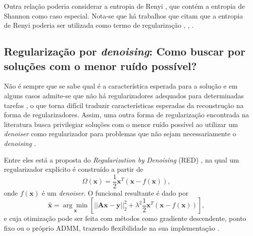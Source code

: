 Outra relação poderia considerar a entropia de Renyi \cite{Silva2016}, que contém a entropia de Shannon como caso especial. Nota-se que há trabalhos que citam que a entropia de Renyi poderia ser utilizada como termo de regularização \cite[pág. 13]{Bercher2008}, \cite[pág. 2822]{Chen2002},  \cite[pág. 8]{Koenker2006}. 

\subsection{Regularização por \textit{denoising}: Como buscar por soluções com o menor ruído possível?}\label{sec:red}  

Não é sempre que se sabe qual é a característica esperada para a solução \cite{Romano2017} e em alguns casos admite-se que não há regularizadores adequados para determinadas tarefas \cite{Reehorst2019},  o que torna difícil traduzir características esperadas da reconstrução na forma de regularizadores. Assim, uma outra forma de regularização encontrada na literatura busca privilegiar soluções com o menor ruído possível ao utilizar um \textit{denoiser} como regularizador para problemas que não sejam necessariamente o \textit{denoising} \cite{Romano2017}. 

Entre eles está a proposta do \textit{Regularization by Denoising} (RED)  \cite{Romano2017}, na qual um regularizador explícito é construído a partir de
\begin{equation}
\Omega(\mathbf{x}) = \frac{1}{2} \mathbf{x}^T \left(\mathbf{x} - f(\mathbf{x})\right), 
\label{eq:RED}
\end{equation}
onde $f(\mathbf{x})$ é um \textit{denoiser}.  O funcional resultante é dado por
\begin{equation}
\hat{\mathbf{x}} = \underset{\mathbf{x}}{\arg\min} \left[ \vert \vert \mathbf{A}\mathbf{x} - \mathbf{y} \vert \vert^2_2 + \lambda^2 \frac{1}{2} \mathbf{x}^T \left(\mathbf{x} - f(\mathbf{x})\right) \right],
\label{eq:RED2}
\end{equation}
 e cuja otimização pode ser feita com métodos como gradiente descendente, ponto fixo ou o próprio ADMM, trazendo flexibilidade na sua implementação \cite[págs. 61-2]{Arridge2019}.
 

